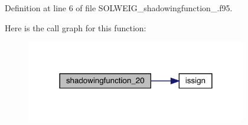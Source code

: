 Definition at line 6 of file S\+O\+L\+W\+E\+I\+G\+\_\+shadowingfunction\+\_.\+f95.

Here is the call graph for this function\+:\nopagebreak
\begin{figure}[H]
\begin{center}
\leavevmode
\includegraphics[width=273pt]{_s_o_l_w_e_i_g__shadowingfunction__20_8f95_a7bdc758721fd0ff5725789e037ea7469_cgraph}
\end{center}
\end{figure}
